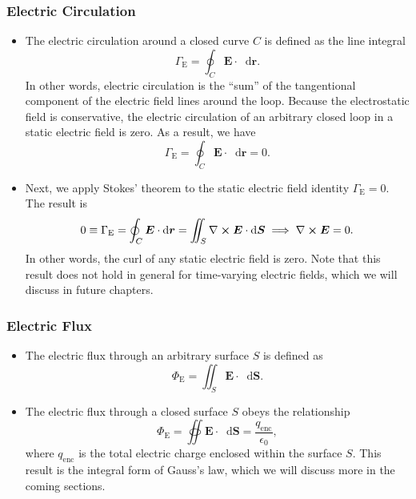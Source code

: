 \documentclass[11pt, a4paper]{article}
\newcommand{\diff}{\mathop{}\!\mathrm{d}} %
\renewcommand{\vec}[1]{\bm{#1}} %
\renewcommand{\r}{\vec{r}}
\newcommand{\E}{\vec{E}} %
\newcommand{\ee}{\epsilon_{0}}  %
\renewcommand{\curl}{\nabla \cross}
\begin{document}
\subsubsection{Electric Circulation}
\begin{itemize}
    \item The electric circulation around a closed curve $ C $ is defined as the line integral
    \begin{equation*}
        \Gamma_{\text{E}} = \oint_{C} \E \cdot \diff \r.
    \end{equation*}
    In other words, electric circulation is the ``sum'' of the tangentional component of the electric field lines around the loop. Because the electrostatic field is conservative, the electric circulation of an arbitrary closed loop in a static electric field is zero. As a result, we have
    \begin{equation*}
        \Gamma_{\text{E}} = \oint_{C} \E \cdot \diff \r = 0.
    \end{equation*}


    \item Next, we apply Stokes' theorem to the static electric field identity $ \Gamma_{\text{E}} = 0 $. The result is
    \begin{equation*}
        0 \equiv \Gamma_{\text{E}} = \oint_{C}\E \cdot \diff \r = \iint_{S} \curl \E \cdot \diff \vec{S} \implies \curl \E = 0.
    \end{equation*}
    In other words, the curl of any static electric field is zero. Note that this result does not hold in general for time-varying electric fields, which we will discuss in future chapters. 

\end{itemize}

\subsubsection{Electric Flux}
\begin{itemize}
    \item The electric flux through an arbitrary surface $ S $ is defined as
    \begin{equation*}
        \Phi_{\text{E}} = \iint_{S} \E \cdot \diff \vec{S}.
    \end{equation*}

    \item The electric flux through a closed surface $ S $ obeys the relationship
    \begin{equation*}
        \Phi_{\text{E}} = \oiint \E \cdot \diff \vec{S} = \frac{q_{\text{enc}}}{\ee},
    \end{equation*}
    where $ q_{\text{enc}} $ is the total electric charge enclosed within the surface $ S $. This result is the integral form of Gauss's law, which we will discuss more in the coming sections.
    
    
    
\end{itemize}
\end{document}
